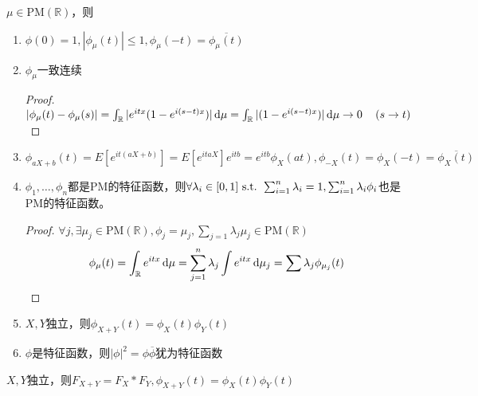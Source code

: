 \documentclass{ctexart}
\begin{document}
\begin{Thm}
  $\mu\in \mathrm{PM}(\mathbb{R})$，则
\begin{enumerate}
\item $\phi(0)=1, |\phi_{\mu}(t)|\leq 1, \phi_{\mu}(-t)=\overline{\phi_{\mu}(t)}$
\item $\phi_{\mu}$一致连续  
\begin{proof}
  $|\phi_{\mu}(t)-\phi_{\mu}(s)|=\int_{\mathbb{R}}|e^{itx}(1-e^{i(s-t)x})|\,\mathrm{d} \mu=\int_{\mathbb{R}}|(1-e^{i(s-t)x})|\,\mathrm{d} \mu\to 0 \quad \left( s\to t \right)$
\end{proof}
\item $\phi_{aX+b}(t)=E[e^{it(aX+b)}]=E[e^{itaX}]e^{itb}=e^{itb}\phi_X(at), \phi_{-X}(t)=\phi_{X}(-t)= \overline{\phi_X(t)}$
\item $\phi_1,\dots,\phi_n$都是$\mathrm{PM}$的特征函数，则$\forall \lambda_{i}\in [0,1]\text{ s.t. } \sum_{i=1}^{n}\lambda_{i}=1, \sum_{i=1}^n\lambda_i\phi_i$也是$\mathrm{PM}$的特征函数。
  \begin{proof}
    $\forall j,\exists \mu_j\in \mathrm{PM}(\mathbb{R}),\phi_j=\mu_j,\sum_{j=1}\lambda_j\mu_j\in \mathrm{PM}(\mathbb{R})$ 
\begin{equation}
\phi_{\mu}(t)=\int_{\mathbb{R}}e^{itx}\,\mathrm{d}\mu=\sum_{j=1}^n\lambda_j\int e^{itx}\,\mathrm{d}\mu_j=\sum\lambda_j\phi_{\mu_j}(t)
\end{equation}
  \end{proof}
\item $X,Y$独立，则$\phi_{X+Y}(t)=\phi_X(t)\phi_Y(t)$
\item $\phi$是特征函数，则$|\phi|^2=\phi \overline{\phi}$犹为特征函数
\end{enumerate}
\end{Thm}

\begin{Rmk}
  $X,Y$独立，则$F_{X+Y}=F_X*F_Y, \phi_{X+Y}(t)=\phi_X(t)\phi_Y(t)$
\end{Rmk}
\end{document}
